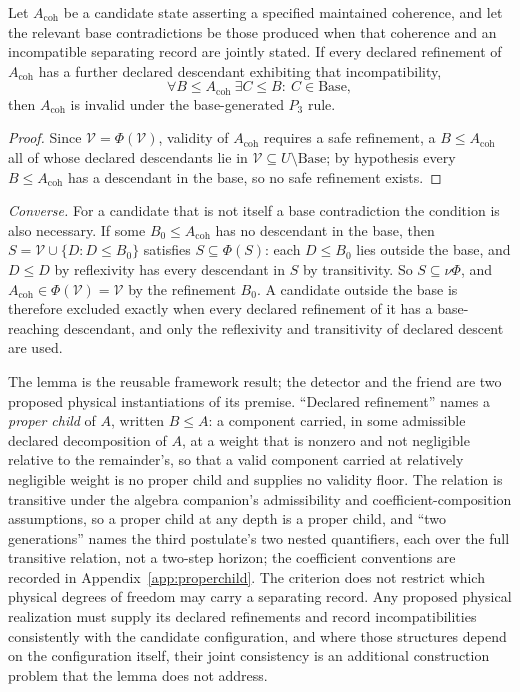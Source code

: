 \begin{lemma}\label{lem:record-exclusion}
Let $A_{\mathrm{coh}}$ be a candidate state asserting a specified maintained coherence, and let the relevant base contradictions be those produced when that coherence and an incompatible separating record are jointly stated. If every declared refinement of $A_{\mathrm{coh}}$ has a further declared descendant exhibiting that incompatibility,
\[
\forall B \le A_{\mathrm{coh}}\ \exists C \le B:\ C \in \mathrm{Base},
\]
then $A_{\mathrm{coh}}$ is invalid under the base-generated $P_3$ rule.
\end{lemma}
\begin{proof}
Since $\mathcal{V} = \Phi(\mathcal{V})$, validity of $A_{\mathrm{coh}}$ requires a safe refinement, a $B \le A_{\mathrm{coh}}$ all of whose declared descendants lie in $\mathcal{V} \subseteq U \setminus \mathrm{Base}$; by hypothesis every $B \le A_{\mathrm{coh}}$ has a descendant in the base, so no safe refinement exists.
\end{proof}

\noindent\emph{Converse.} For a candidate that is not itself a base contradiction the condition is also necessary. If some $B_0 \le A_{\mathrm{coh}}$ has no descendant in the base, then $S = \mathcal{V} \cup \{D : D \le B_0\}$ satisfies $S \subseteq \Phi(S)$: each $D \le B_0$ lies outside the base, and $D \le D$ by reflexivity has every descendant in $S$ by transitivity. So $S \subseteq \nu\Phi$, and $A_{\mathrm{coh}} \in \Phi(\mathcal{V}) = \mathcal{V}$ by the refinement $B_0$. A candidate outside the base is therefore excluded exactly when every declared refinement of it has a base-reaching descendant, and only the reflexivity and transitivity of declared descent are used.

\noindent The lemma is the reusable framework result; the detector and the friend are two proposed physical instantiations of its premise. ``Declared refinement'' names a \emph{proper child} of $A$, written $B \le A$: a component carried, in some admissible declared decomposition of $A$, at a weight that is nonzero and not negligible relative to the remainder's, so that a valid component carried at relatively negligible weight is no proper child and supplies no validity floor. The relation is transitive under the algebra companion's admissibility and coefficient-composition assumptions, so a proper child at any depth is a proper child, and ``two generations'' names the third postulate's two nested quantifiers, each over the full transitive relation, not a two-step horizon; the coefficient conventions are recorded in Appendix~\ref{app:properchild}. The criterion does not restrict which physical degrees of freedom may carry a separating record. Any proposed physical realization must supply its declared refinements and record incompatibilities consistently with the candidate configuration, and where those structures depend on the configuration itself, their joint consistency is an additional construction problem that the lemma does not address.

